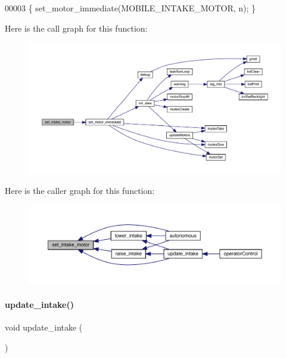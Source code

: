 \begin{DoxyCode}
00003 \{ set_motor_immediate(MOBILE\_INTAKE\_MOTOR, n); \}
\end{DoxyCode}
Here is the call graph for this function\+:
\nopagebreak
\begin{figure}[H]
\begin{center}
\leavevmode
\includegraphics[width=350pt]{mobile__goal__intake_8c_ab31e12bb0fa46c77906a048666b699d5_cgraph}
\end{center}
\end{figure}
Here is the caller graph for this function\+:
\nopagebreak
\begin{figure}[H]
\begin{center}
\leavevmode
\includegraphics[width=350pt]{mobile__goal__intake_8c_ab31e12bb0fa46c77906a048666b699d5_icgraph}
\end{center}
\end{figure}
\mbox{\label{mobile__goal__intake_8c_a5d7bad8a208988af743fd2e68f111286}} 
\paragraph{update\+\_\+intake()}
{\footnotesize\ttfamily void update\+\_\+intake (\begin{DoxyParamCaption}{ }\end{DoxyParamCaption})}



